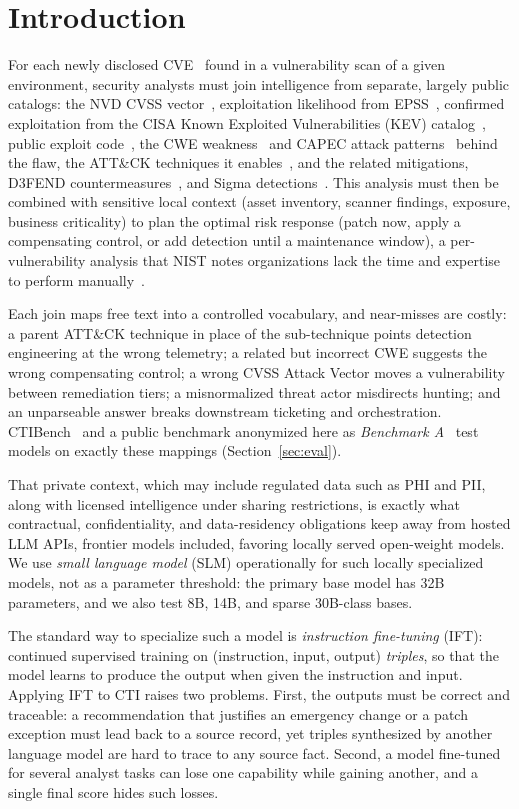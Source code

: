 \documentclass[conference]{IEEEtran}
\begin{document}
\section{Introduction}
For each newly disclosed CVE~\cite{cve} found in a vulnerability scan of a given environment, security analysts must join intelligence from separate, largely public catalogs: the NVD CVSS vector~\cite{nvd}, exploitation likelihood from EPSS~\cite{jacobs2021epss}, confirmed exploitation from the CISA Known Exploited Vulnerabilities (KEV) catalog~\cite{cisakev}, public exploit code~\cite{exploitdb,pocingithub}, the CWE weakness~\cite{cwe} and CAPEC attack patterns~\cite{capec} behind the flaw, the ATT\&CK techniques it enables~\cite{strom2018attack}, and the related mitigations, D3FEND countermeasures~\cite{d3fend}, and Sigma detections~\cite{sigma}. This analysis must then be combined with sensitive local context (asset inventory, scanner findings, exposure, business criticality) to plan the optimal risk response (patch now, apply a compensating control, or add detection until a maintenance window), a per-vulnerability analysis that NIST notes organizations lack the time and expertise to perform manually~\cite{nist80040r4}.

Each join maps free text into a controlled vocabulary, and near-misses are costly: a parent ATT\&CK technique in place of the sub-technique points detection engineering at the wrong telemetry; a related but incorrect CWE suggests the wrong compensating control; a wrong CVSS Attack Vector moves a vulnerability between remediation tiers; a misnormalized threat actor misdirects hunting; and an unparseable answer breaks downstream ticketing and orchestration. CTIBench~\cite{ctibench} and a public benchmark anonymized here as \emph{Benchmark A}~\cite{anonbench} test models on exactly these mappings (Section~\ref{sec:eval}).

That private context, which may include regulated data such as PHI and PII, along with licensed intelligence under sharing restrictions, is exactly what contractual, confidentiality, and data-residency obligations keep away from hosted LLM APIs, frontier models included, favoring locally served open-weight models. We use \emph{small language model} (SLM) operationally for such locally specialized models, not as a parameter threshold: the primary base model has 32B parameters, and we also test 8B, 14B, and sparse 30B-class bases.

The standard way to specialize such a model is \emph{instruction fine-tuning} (IFT): continued supervised training on (instruction, input, output) \emph{triples}, so that the model learns to produce the output when given the instruction and input. Applying IFT to CTI raises two problems. First, the outputs must be correct and traceable: a recommendation that justifies an emergency change or a patch exception must lead back to a source record, yet triples synthesized by another language model are hard to trace to any source fact. Second, a model fine-tuned for several analyst tasks can lose one capability while gaining another, and a single final score hides such losses.
\end{document}
